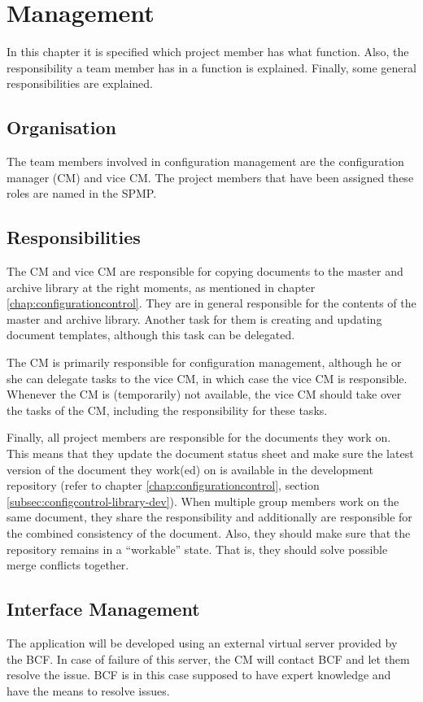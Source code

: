 \chapter{Management}
\label{chap:management}
In this chapter it is specified which project member has what function. Also, the responsibility a team member has in a function is explained. Finally, some general responsibilities are explained.

\section{Organisation}
The team members involved in configuration management are the configuration manager (CM) and vice CM. The project members that have been assigned these roles are named in the SPMP.

\section{Responsibilities}
The CM and vice CM are responsible for copying documents to the master and archive library at the right moments, as mentioned in chapter \ref{chap:configurationcontrol}. They are in general responsible for the contents of the master and archive library. Another task for them is creating and updating document templates, although this task can be delegated.

The CM is primarily responsible for configuration management, although he or she can delegate tasks to the vice CM, in which case the vice CM is responsible. Whenever the CM is (temporarily) not available, the vice CM should take over the tasks of the CM, including the responsibility for these tasks.

Finally, all project members are responsible for the documents they work on. This means that they update the document status sheet and make sure the latest version of the document they work(ed) on is available in the development repository (refer to chapter \ref{chap:configurationcontrol}, section \ref{subsec:configcontrol-library-dev}). When multiple group members work on the same document, they share the responsibility and additionally are responsible for the combined consistency of the document. Also, they should make sure that the repository remains in a ``workable'' state. That is, they should solve possible merge conflicts together.

\section{Interface Management}
\label{sec:interfacemanagement}
The \projectname{} application will be developed using an external virtual server provided by the BCF. In case of failure of this server, the CM will contact BCF and let them resolve the issue. BCF is in this case supposed to have expert knowledge and have the means to resolve issues.

